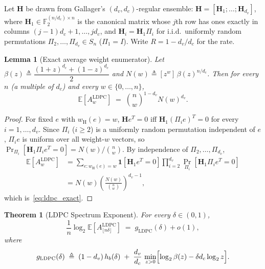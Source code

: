 \documentclass[journal,10pt,onecolumn]{IEEEtran}
\newtheorem{theorem}{Theorem}
\newtheorem{lemma}{Lemma}
\newcommand{\Fb}{\mathbb{F}}
\newcommand{\Eb}{\mathbb{E}}
\newcommand{\wH}{w_{\mathrm{H}}}
\newcommand{\Hb}{h_b}
\newcommand{\Hm}{\mathbf{H}}
\begin{document}
Let $\Hm$ be drawn from Gallager's $(d_v,d_c)$-regular ensemble:
$\Hm=[\Hm_1;\dots;\Hm_{d_v}]$, where $\Hm_1\in\Fb_2^{(n/d_c)\times n}$ is the
canonical matrix whose $j$th row has ones exactly in columns
$(j{-}1)d_c{+}1,\ldots,jd_c$, and $\Hm_i=\Hm_1\Pi_i$ for i.i.d.\ uniformly
random permutations $\Pi_2,\ldots,\Pi_{d_v}\in S_n$ ($\Pi_1=I$).
Write $R=1-d_v/d_c$ for the rate.

\begin{lemma}[Exact average weight enumerator]
\label{lem:ldpc_exact}
Let $\beta(z)\triangleq\dfrac{(1+z)^{d_c}+(1-z)^{d_c}}{2}$ and
$N(w)\triangleq[z^w]\,\beta(z)^{n/d_c}$.
Then for every $n$ (a multiple of $d_c$) and every $w\in\{0,\ldots,n\}$,
\begin{equation}
    \Eb\!\left[A_w^{\mathrm{LDPC}}\right]
    \;=\;
    \binom{n}{w}^{1-d_v} N(w)^{d_v}.
    \label{eq:ldpc_exact}
\end{equation}
\end{lemma}

\begin{proof}
For fixed $e$ with $\wH(e)=w$, $\Hm e^T=0$ iff $\Hm_1(\Pi_i e)^T=0$ for every
$i=1,\ldots,d_v$. Since $\Pi_i$ ($i\ge 2$) is a uniformly random permutation
independent of $e$, $\Pi_i e$ is uniform over all weight-$w$ vectors, so
$\Pr_{\Pi_i}[\Hm_1\Pi_i e^T=0]=N(w)/\binom{n}{w}$.
By independence of $\Pi_2,\ldots,\Pi_{d_v}$,
\begin{align*}
    \Eb[A_w^{\mathrm{LDPC}}]
    &=\sum_{e:\wH(e)=w}\mathbf{1}[\Hm_1 e^T=0]
    \prod_{i=2}^{d_v}\Pr_{\Pi_i}[\Hm_1\Pi_i e^T=0]\\
    &=N(w)\left(\frac{N(w)}{\binom{n}{w}}\right)^{d_v-1},
\end{align*}
which is~\eqref{eq:ldpc_exact}.
\end{proof}

\begin{theorem}[LDPC Spectrum Exponent]
\label{thm:ldpc_spectrum}
For every $\delta\in(0,1)$,
\begin{equation}
    \frac{1}{n}\log_2\Eb\!\left[A_{\lfloor n\delta\rfloor}^{\mathrm{LDPC}}\right]
    \;=\;
    g_{\mathrm{LDPC}}(\delta)+o(1),
    \label{eq:ldpc_spectrum}
\end{equation}
where
\begin{equation}
    g_{\mathrm{LDPC}}(\delta)
    \;\triangleq\;
    (1-d_v)\,\Hb(\delta)
    \;+\;
    \frac{d_v}{d_c}\,
    \min_{z>0}\Bigl[\log_2\beta(z)-\delta d_c\log_2 z\Bigr].
    \label{eq:gldpc_def}
\end{equation}
\end{theorem}
\end{document}
